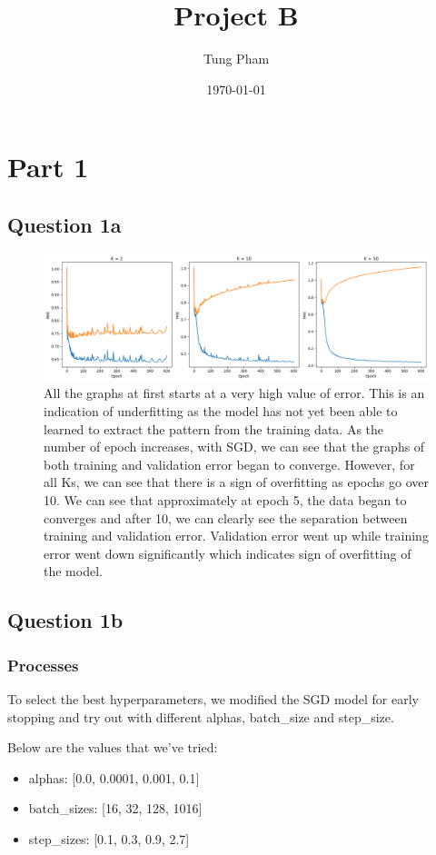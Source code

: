 \documentclass[a4paper]{article}
\title{Project B}
\author{Tung Pham}
\date{\today}
\begin{document}
\maketitle

\section{Part 1}
\subsection{Question 1a}
\begin{figure}[ht]
	\includegraphics[width=\textwidth]{../images/Figure1a.png}
	\caption{All the graphs at first starts at a very high value of error. This is
  an indication of underfitting as the model has not yet been able to learned to
extract the pattern from the training data. As the number of epoch
increases, with SGD, we can see that the graphs of both training and validation
error began to converge. However, for all Ks, we can see that there is a sign of
overfitting as epochs go over 10. We can see that approximately at epoch 5, the
data began to converges and after 10, we can clearly see the separation between
training and validation error. Validation error went up while training error
went down significantly which indicates sign of overfitting of the model.}
\end{figure}
\subsection{Question 1b}
\subsubsection{Processes}
To select the best hyperparameters, we modified the SGD model for early stopping
and try out with different alphas, batch\_size and step\_size.

Below are the values that we've tried:
\begin{itemize}
  \item alphas: [0.0, 0.0001, 0.001, 0.1]
  \item batch\_sizes: [16, 32, 128, 1016]
  \item step\_sizes: [0.1, 0.3, 0.9, 2.7]
\end{itemize}
\end{document}
